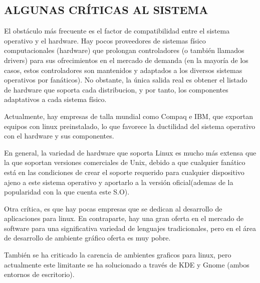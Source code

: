 \subsection*{ALGUNAS CRÍTICAS AL SISTEMA}

El obstáculo más frecuente es el factor de compatibilidad entre
el sistema operativo y el hardware. Hay pocos proveedores de
sistemas físico computacionales (hardware) que prolongan
controladores (o también llamados drivers) para sus
ofrecimientos en el mercado de demanda (en la mayoría de los
casos, estos controladores son mantenidos y adaptados a los
diversos sistemas operativos por fanáticos). No obstante, la
única salida real es obtener el listado de hardware que soporta
cada distribucion, y por tanto, los componentes adaptativos a
cada sistema físico.

Actualmente, hay empresas de talla mundial como Compaq e
IBM, que exportan equipos con linux preinstalado, lo que
favorece la ductilidad del sistema operativo con el hardware y
sus componentes.

En general, la variedad de hardware que soporta Linux es
mucho más extensa que la que soportan versiones comerciales
de Unix, debido a que cualquier fanático está en las condiciones
de crear el soporte requerido para cualquier dispositivo ajeno a
este sistema operativo y aportarlo a la versión oficial(ademas de
la popularidad con la que cuenta este S.O).

Otra crítica, es que hay pocas empresas que se dedican al
desarrollo de aplicaciones para linux. En contraparte, hay una
gran oferta en el mercado de software para una significativa
variedad de lenguajes tradicionales, pero en el área de
desarrollo de ambiente gráfico oferta es muy pobre.

También se ha criticado la carencia de ambientes graficos para
linux, pero actualmente este limitante se ha solucionado a través
de KDE y Gnome (ambos entornos de escritorio).

